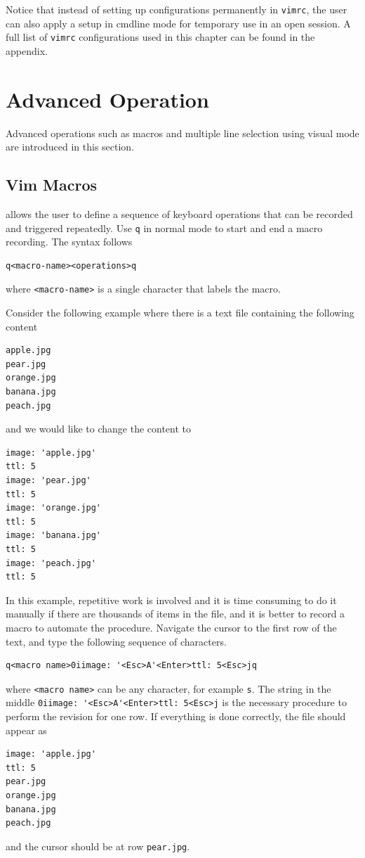 Notice that instead of setting up configurations permanently in \verb|vimrc|, the user can also apply a setup in cmdline mode for temporary use in an open session. A full list of \verb|vimrc| configurations used in this chapter can be found in the appendix.

\section{Advanced Operation}

Advanced operations such as macros and multiple line selection using visual mode are introduced in this section.

\subsection{Vim Macros}

 allows the user to define a sequence of keyboard operations that can be recorded and triggered repeatedly. Use \verb|q| in normal mode to start and end a macro recording. The syntax follows
\begin{lstlisting}
q<macro-name><operations>q
\end{lstlisting}
where \verb|<macro-name>| is a single character that labels the macro.

Consider the following example where there is a text file containing the following content
\begin{lstlisting}
apple.jpg
pear.jpg
orange.jpg
banana.jpg
peach.jpg
\end{lstlisting}
and we would like to change the content to
\begin{lstlisting}
image: 'apple.jpg'
ttl: 5
image: 'pear.jpg'
ttl: 5
image: 'orange.jpg'
ttl: 5
image: 'banana.jpg'
ttl: 5
image: 'peach.jpg'
ttl: 5
\end{lstlisting}

In this example, repetitive work is involved and it is time consuming to do it manually if there are thousands of items in the file, and it is better to record a macro to automate the procedure. Navigate the cursor to the first row of the text, and type the following sequence of characters.
\begin{lstlisting}
q<macro name>0iimage: '<Esc>A'<Enter>ttl: 5<Esc>jq
\end{lstlisting}
where \verb|<macro name>| can be any character, for example \verb|s|. The string in the middle \verb|0iimage: '<Esc>A'<Enter>ttl: 5<Esc>j| is the necessary procedure to perform the revision for one row. If everything is done correctly, the file should appear as
\begin{lstlisting}
image: 'apple.jpg'
ttl: 5
pear.jpg
orange.jpg
banana.jpg
peach.jpg
\end{lstlisting}
and the cursor should be at row \verb|pear.jpg|.

